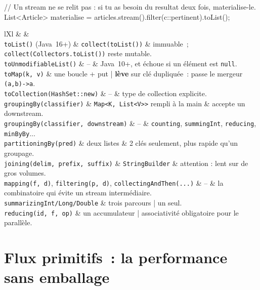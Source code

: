 \begin{codejava}
// Un stream ne se relit pas : si tu as besoin du resultat deux fois, materialise-le.
List<Article> materialise = articles.stream().filter(c::pertinent).toList();
\end{codejava}

\begin{tabz}{lXl}
  \headrow {} \&  \&  \\
  \midrule
  \verb|toList()| (Java~16+) \& \verb|collect(toList())| \& immuable~; \verb|collect(Collectors.toList())| reste mutable. \\
  \verb|toUnmodifiableList()| \& -- \& Java~10+, et \'echoue si un \'el\'ement est \verb|null|. \\
  \verb|toMap(k, v)| \& une boucle + put | \textbf{l\`eve} sur cl\'e dupliqu\'ee~: passe le mergeur \verb|(a,b)->a|. \\
  \verb|toCollection(HashSet::new)| \& -- \& type de collection explicite. \\
  \verb|groupingBy(classifier)| \& \verb|Map<K, List<V>>| rempli \`a la main \& accepte un downstream. \\
  \verb|groupingBy(classifier, downstream)| \& -- \& \verb|counting|, \verb|summingInt|, \verb|reducing|, \verb|minByBy|... \\
  \verb|partitioningBy(pred)| \& deux listes \& 2 cl\'es seulement, plus rapide qu'un groupage. \\
  \verb|joining(delim, prefix, suffix)| \& \verb|StringBuilder| \& attention : lent sur de gros volumes. \\
  \verb|mapping(f, d)|, \verb|filtering(p, d)|, \verb|collectingAndThen(...)| \& -- \& la combinatoire qui \'evite un stream interm\'ediaire. \\
  \verb|summarizingInt/Long/Double| \& trois parcours | un seul. \\
  \verb|reducing(id, f, op)| \& un accumulateur | associativit\'e obligatoire pour le parall\`ele. \\
\end{tabz}

\section{Flux primitifs~: la performance sans emballage}

